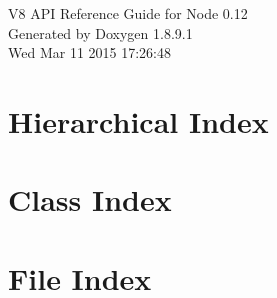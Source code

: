 \documentclass[twoside]{book}
\newcommand{\+}{\discretionary{\mbox{\scriptsize$\hookleftarrow$}}{}{}}
\newcommand{\clearemptydoublepage}{%
  \newpage{\pagestyle{empty}\cleardoublepage}%
}
\begin{document}
\hypersetup{pageanchor=false,
             bookmarks=true,
             bookmarksnumbered=true,
             pdfencoding=unicode
            }
\begin{titlepage}
\vspace*{7cm}
\begin{center}%
{\Large V8 A\+P\+I Reference Guide for Node 0.12 }\\
\vspace*{1cm}
{\large Generated by Doxygen 1.8.9.1}\\
\vspace*{0.5cm}
{\small Wed Mar 11 2015 17:26:48}\\
\end{center}
\end{titlepage}
\clearemptydoublepage
\tableofcontents
\clearemptydoublepage
{}
\hypersetup{pageanchor=true}

\chapter{Hierarchical Index}

\chapter{Class Index}

\chapter{File Index}

\end{document}
